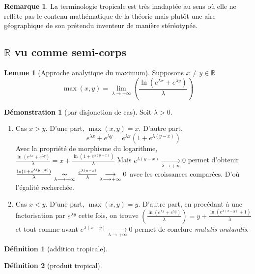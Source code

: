 \documentclass{article}
\newcommand{\R}{\mathbb{R}} %
\theoremstyle{definition} %
\newtheorem{defi}{Définition}
\newtheorem{rmq}{Remarque}
\newtheorem{lem}{Lemme}
\newtheorem{dem}{Démonstration}
\newcommand{\tend}{\longrightarrow}
\newcommand{\tendqd}[2]{\underset{#1 \tend #2}{\tend}}
\newcommand{\1}{\mathbb{1}} %
\begin{document}
\begin{rmq}
La terminologie tropicale est très inadaptée au sens où elle ne reflète pas le contenu mathématique de la théorie mais plutôt une aire géographique de son prétendu inventeur de manière stéréotypée.
\end{rmq}

\subsection{$\R$ vu comme semi-corps}

\begin{lem}[Approche analytique du maximum]
    Supposons $x \neq y \in \R $
    $$\max(x,y)= \lim_{\lambda \tend +\infty}  \left(\frac{\ln(e^{\lambda x} + e^{\lambda y})}{\lambda}\right)$$
\end{lem}

\begin{dem}[par disjonction de cas]
    Soit $\lambda > 0$.
\begin{enumerate}
        \item Cas $x > y$. D'une part, $\max(x,y)=x$. D'autre part,
    $$e^{\lambda x} + e^{\lambda y} = e^{\lambda x} (1 + e^{\lambda (y-x)})$$
    Avec la propriété de morphisme du logarithme,
     $ \frac{\ln(e^{\lambda x} + e^{\lambda y})}{\lambda} =  x + \frac{\ln(1 + e^{\lambda (y-x)})}{\lambda} $
     Mais $e^{\lambda (y-x)} \tendqd{\lambda}{+\infty} 0$ permet d'obtenir $\frac{\ln(1 + e^{\lambda (y-x)})}{\lambda} \underset{\lambda \tend +\infty}{\thicksim} \frac{e^{\lambda (y-x)}}{\lambda} \tendqd{\lambda}{+\infty} 0$ avec les croissances comparées.
     D'où l'égalité recherchée.
     \item Cas $x < y$. D'une part, $\max(x,y)=y$.
D'autre part, en procédant à une factorisation par $e^{\lambda y}$ cette fois, on trouve 
$ \left(\frac{\ln(e^{\lambda x} + e^{\lambda y})}{\lambda}\right) = y + \frac{\ln(e^{\lambda (x-y)} + 1)}{\lambda} $ et tout comme avant $e^{\lambda (x-y)} \tendqd{\lambda}{+\infty} 0$ permet de conclure \textit{mutatis mutandis}.

\end{enumerate}
\end{dem}

\begin{defi}[addition tropicale]
    
\end{defi}

\begin{defi}[produit tropical]
    
\end{defi}
\end{document}
